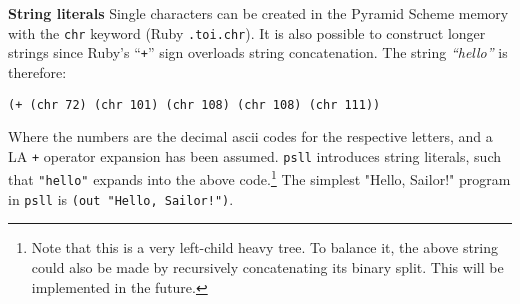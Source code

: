 \documentclass[aip,jcp,reprint,footinbib]{revtex4-1}
\let\tt\texttt
\newcommand\psll{\texttt{psll}\xspace}
\newcommand{\ilpsll}[1]{\lstinline[language=psll,columns=flexible]{#1}}
\begin{document}
\textbf{String literals} Single characters can be created in the Pyramid Scheme memory with the \tt{chr} keyword (Ruby \tt{.to\textunderscore{}i.chr}). It is also possible to construct longer strings since Ruby's \enquote{\tt{+}} sign overloads string concatenation. The string \textit{\enquote{hello}} is therefore:
\begin{lstlisting}[language=psll,aboveskip=3pt,belowskip=-2pt,frame=none,numbers=none]
  (+ (chr 72) (chr 101) (chr 108) (chr 108) (chr 111))
\end{lstlisting}
Where the numbers are the decimal ascii codes for the respective letters, and a LA \tt{+} operator expansion has been assumed. \psll introduces string literals, such that \ilpsll{"hello"} expands into the above code.\footnote{Note that this is a very left-child heavy tree. To balance it, the above string could also be made by recursively concatenating its binary split. This will be implemented in the future.} The simplest "Hello, Sailor!" program in \psll is \ilpsll{(out "Hello, Sailor!")}.
\end{document}
